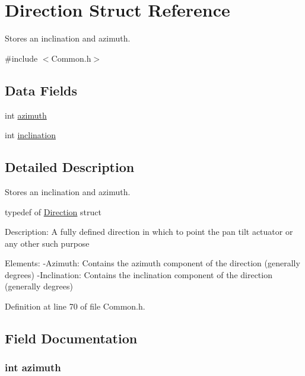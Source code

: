 \hypertarget{struct_direction}{\section{Direction Struct Reference}
\label{struct_direction}
}


Stores an inclination and azimuth.  




{\ttfamily \#include $<$Common.\+h$>$}

\subsection*{Data Fields}
\begin{DoxyCompactItemize}
\item 
int \hyperlink{struct_direction_a866e78e12cb32dcaf1ded89bda8be8f5}{azimuth}
\item 
int \hyperlink{struct_direction_af308b9934394c8bcf7614eb1df2d863f}{inclination}
\end{DoxyCompactItemize}


\subsection{Detailed Description}
Stores an inclination and azimuth. 



 typedef of \hyperlink{struct_direction}{Direction} struct

Description\+: A fully defined direction in which to point the pan tilt actuator or any other such purpose

Elements\+: -\/\+Azimuth\+: Contains the azimuth component of the direction (generally degrees) -\/\+Inclination\+: Contains the inclination component of the direction (generally degrees) 

Definition at line 70 of file Common.\+h.



\subsection{Field Documentation}
\hypertarget{struct_direction_a866e78e12cb32dcaf1ded89bda8be8f5}{
\subsubsection[{azimuth}]{\setlength{\rightskip}{0pt plus 5cm}int azimuth}}\label{struct_direction_a866e78e12cb32dcaf1ded89bda8be8f5}


